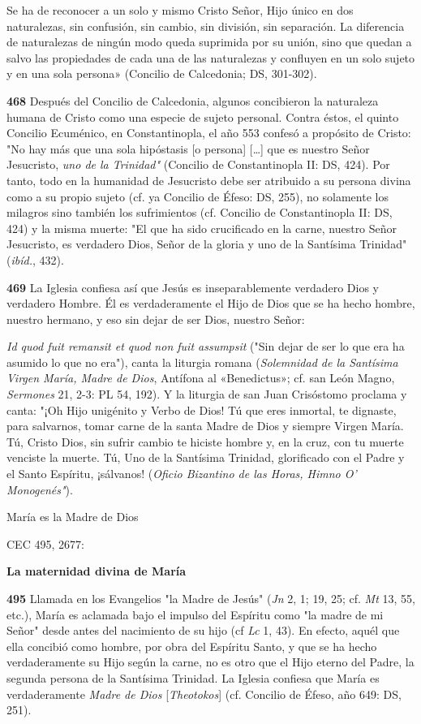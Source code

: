 \documentclass[]{article}
\begin{document}
Se ha de reconocer a un solo y mismo Cristo Señor, Hijo único en dos
naturalezas, sin confusión, sin cambio, sin división, sin separación. La
diferencia de naturalezas de ningún modo queda suprimida por su unión,
sino que quedan a salvo las propiedades de cada una de las naturalezas y
confluyen en un solo sujeto y en una sola persona» (Concilio de
Calcedonia; DS, 301-302).

\textbf{468} Después del Concilio de Calcedonia, algunos concibieron la
naturaleza humana de Cristo como una especie de sujeto personal. Contra
éstos, el quinto Concilio Ecuménico, en Constantinopla, el año 553
confesó a propósito de Cristo: "No hay más que una sola hipóstasis {[}o
persona{]} [\ldots{}] que es nuestro Señor Jesucristo, \emph{uno de la
Trinidad"} (Concilio de Constantinopla II: DS, 424). Por tanto, todo en
la humanidad de Jesucristo debe ser atribuido a su persona divina como a
su propio sujeto (cf. ya Concilio de Éfeso: DS, 255), no solamente los
milagros sino también los sufrimientos (cf. Concilio de Constantinopla
II: DS, 424) y la misma muerte: "El que ha sido crucificado en la carne,
nuestro Señor Jesucristo, es verdadero Dios, Señor de la gloria y uno de
la Santísima Trinidad" (\emph{ibíd.}, 432).

\textbf{469} La Iglesia confiesa así que Jesús es inseparablemente
verdadero Dios y verdadero Hombre. Él es verdaderamente el Hijo de Dios
que se ha hecho hombre, nuestro hermano, y eso sin dejar de ser Dios,
nuestro Señor:

\emph{Id quod fuit remansit et quod non fuit assumpsit} ("Sin dejar de
ser lo que era ha asumido lo que no era"), canta la liturgia romana
(\emph{Solemnidad de la Santísima Virgen María, Madre de Dios}, Antífona
al «Benedictus»; cf. san León Magno, \emph{Sermones} 21, 2-3: PL 54,
192). Y la liturgia de san Juan Crisóstomo proclama y canta: "¡Oh Hijo
unigénito y Verbo de Dios! Tú que eres inmortal, te dignaste, para
salvarnos, tomar carne de la santa Madre de Dios y siempre Virgen María.
Tú, Cristo Dios, sin sufrir cambio te hiciste hombre y, en la cruz, con
tu muerte venciste la muerte. Tú, Uno de la Santísima Trinidad,
glorificado con el Padre y el Santo Espíritu, ¡sálvanos! (\emph{Oficio
Bizantino de las Horas, Himno O' Monogenés"}).

María es la Madre de Dios

CEC 495, 2677:

\textbf{La maternidad divina de María}

\textbf{495} Llamada en los Evangelios "la Madre de Jesús" (\emph{Jn} 2,
1; 19, 25; cf. \emph{Mt} 13, 55, etc.), María es aclamada bajo el
impulso del Espíritu como "la madre de mi Señor" desde antes del
nacimiento de su hijo (cf \emph{Lc} 1, 43). En efecto, aquél que ella
concibió como hombre, por obra del Espíritu Santo, y que se ha hecho
verdaderamente su Hijo según la carne, no es otro que el Hijo eterno del
Padre, la segunda persona de la Santísima Trinidad. La Iglesia confiesa
que María es verdaderamente \emph{Madre de Dios} {[}\emph{Theotokos}{]}
(cf. Concilio de Éfeso, año 649: DS, 251).
\end{document}
